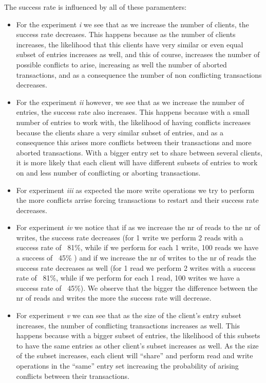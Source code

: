 \documentclass[a4paper, 11pt]{article}
\begin{document}
The success rate is influenced by all of these paramenters:\\
\begin{itemize}
\item For the experiment \textit{i} we see that as we increase the number of clients, the success rate decreases. This happens because as the number of clients increases, the likelihood that this clients have very similar or even equal subset of entries increases as well, and this of course, increases the number of possible conflicts to arise, increasing as well the number of aborted transactions, and as a consequence the number of non conflicting transactions decreases.\\

\item For the experiment \textit{ii} however, we see that as we increase the number of entries, the success rate also increases. This happens because with a small number of entries to work with, the likelihood of having conflicts increases because the clients share a very similar subset of entries, and as a consequence this arises more conflicts between their transactions and more aborted transactions. With a bigger entry set to share between several clients, it is more likely that each client will have different subsets of entries to work on and less number of conflicting or aborting transactions.\\

\item For experiment \textit{iii} as expected the more write operations we try to perform the more conflicts arrise forcing transactions to restart and their success rate decreases.\\

\item For experiment \textit{iv} we notice that if as we increase the nr of reads to the nr of writes, the success rate decreases (for 1 write we perform 2 reads with a success rate of ~81\%, while if we perform for each 1 write, 100 reads we have a success of ~45\% ) and if we increase the nr of writes to the nr of reads the success rate decreases as well (for 1 read we perform 2 writes with a success rate of ~81\%, while if we perform for each 1 read, 100 writes we have a success rate of ~45\%). We observe that the bigger the difference between the nr of reads and writes the more the success rate will decrease.\\

\item For experiment \textit{v} we can see that as the size of the client's entry subset increases, the number of conflicting transactions increases as well. This happens because with a bigger subset of entries, the likelihood of this subsets to have the same entries as other client's subset increases as well. As the size of the subset increases, each client will ``share'' and perform read and write operations in the ``same'' entry set increasing the probability of arising conflicts between their transactions.\\

\end{itemize}
\end{document}

